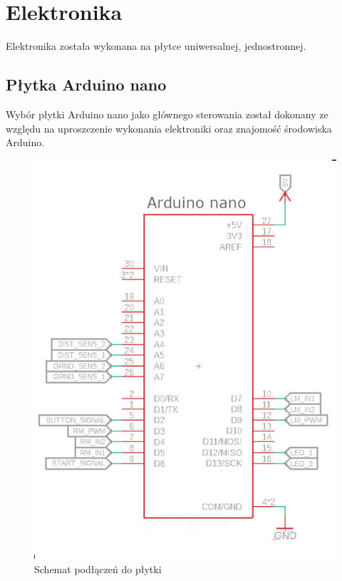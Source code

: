 \documentclass[polish,polish,a4paper]{article}
\begin{document}
 


\newpage

\section{Elektronika}
    Elektronika została wykonana na płytce uniwersalnej, jednostronnej. 
    \subsection{Płytka Arduino nano}
        Wybór płytki Arduino nano jako głównego sterowania został dokonany ze względu na uproszczenie wykonania elektroniki oraz znajomość środowiska Arduino.
       
        \begin{figure}[!htb]
       \begin{minipage}{0.3\textwidth}
         \centering
         \includegraphics[width=2.3\linewidth]{Scheme/Arduino.jpg}
         \caption{Schemat podłączeń do płytki}\label{Fig:Data1}

\end{minipage}
\end{figure}
\end{document}
